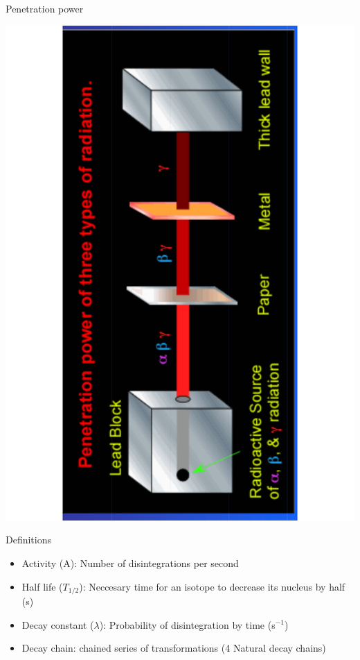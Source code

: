 \begin{frame}{Penetration power}

\centering
\includegraphics[scale=0.35, angle=-90]{figures/20160218_rsw_penetration.pdf}

\end{frame}

\begin{frame}{Definitions}

\begin{exampleblock}{}

\begin{itemize}
	\item Activity (A): Number of disintegrations per second
\item Half life ($T_{1/2}$): Neccesary time for an isotope to decrease its nucleus by half (s)
\item Decay constant ($\lambda$): Probability of disintegration by time (s$^{-1}$)
\item Decay chain: chained series of transformations (4 Natural decay chains)
\end{itemize}

\end{exampleblock}

\end{frame}

